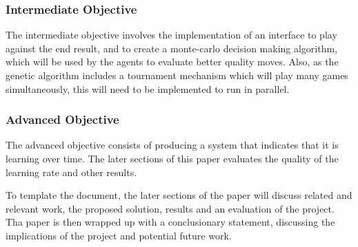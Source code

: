 \documentclass[12pt,a4paper]{article}
\begin{document}
    \subsubsection*{Intermediate Objective}
        The intermediate objective involves the implementation of an interface to play against the end result, and to create a monte-carlo decision making algorithm, which will be used by the agents to evaluate better quality moves. Also, as the genetic algorithm includes a tournament mechanism which will play many games simultaneously, this will need to be implemented to run in parallel.
        
    \subsubsection*{Advanced Objective}
        The advanced objective consists of producing a system that indicates that it is learning over time. The later sections of this paper evaluates the quality of the learning rate and other results. 
    
    To template the document, the later sections of the paper will discuss related and relevant work, the proposed solution, results and an evaluation of the project. Tha paper is then wrapped up with a conclusionary statement, discussing the implications of the project and potential future work.

\end{document}
